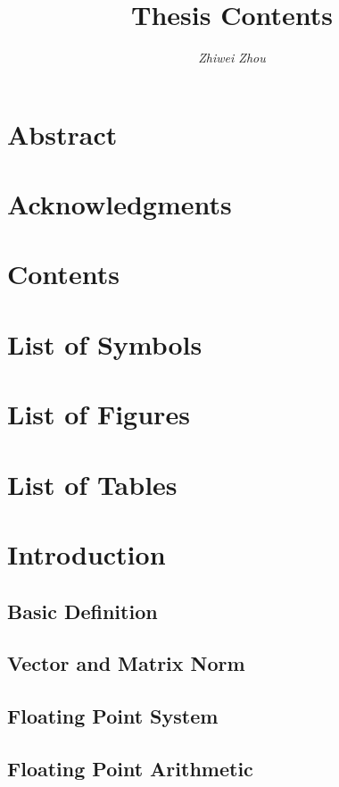 \documentclass[11pt]{article}
\title{\textbf{Thesis Contents}}
\author{\textit{Zhiwei Zhou}}
\begin{document}
\maketitle


\section*{Abstract}
\section*{Acknowledgments}
\section*{Contents}
\section{List of Symbols}


\section{List of Figures}


\section{List of Tables}





\section{Introduction}


\subsection{Basic Definition}

\subsection{Vector and Matrix Norm}

\subsection{Floating Point System}

\subsection{Floating Point Arithmetic}
\end{document}
